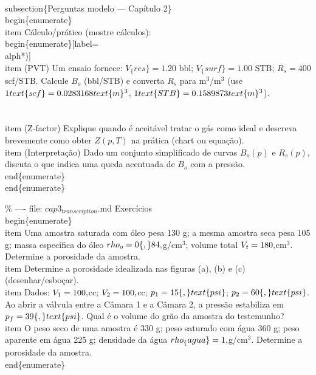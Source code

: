 \documentclass[11pt,a4paper]{article}
\begin{document}
\begin{enumerate}
{\\subsection\{Perguntas modelo — Capítulo 2\}
\\begin\{enumerate\}
\\item Cálculo/prático (mostre cálculos):
\\begin\{enumerate\}[label=\\alph*)]
\\item (PVT) Um ensaio fornece: $V_\{res\}=1.20$ bbl; $V_\{surf\}=1.00$ STB; $R_s=400$ scf/STB. Calcule $B_o$ (bbl/STB) e converta $R_s$ para m$^3$/m$^3$ (use $1\\ \\text\{scf\}=0.0283168\\ \\text\{m\}^3$, $1\\ \\text\{STB\}=0.1589873\\ \\text\{m\}^3$).\\\\[2\\baselineskip]
\\item (Z‑factor) Explique quando é aceitável tratar o gás como ideal e descreva brevemente como obter $Z(p,T)$ na prática (chart ou equação).
\\item (Interpretação) Dado um conjunto simplificado de curvas $B_o(p)$ e $R_s(p)$, discuta o que indica uma queda acentuada de $B_o$ com a pressão.
\\end\{enumerate\}
\\end\{enumerate\}


\% ---- file: $cap3_{transcription}$.md
Exercícios
\\begin\{enumerate\}
\\item Uma amostra saturada com óleo pesa 130 g; a mesma amostra seca pesa 105 g; massa específica do óleo $\\rho_o=0\{,\}84\\,$g/cm$^3$; volume total $V_t=180\\,$cm$^3$. Determine a porosidade da amostra.
\\item Determine a porosidade idealizada nas figuras (a), (b) e (c) (desenhar/esboçar).
\\item Dados: $V_1=100\\,$cc; $V_2=100\\,$cc; $p_1=15\{\\,\}\\text\{psi\}$; $p_2=60\{\\,\}\\text\{psi\}$. Ao abrir a válvula entre a Câmara 1 e a Câmara 2, a pressão estabiliza em $p_f=39\{\\,\}\\text\{psi\}$. Qual é o volume do grão da amostra do testemunho?
\\item O peso seco de uma amostra é 330 g; peso saturado com água 360 g; peso aparente em água 225 g; densidade da água $\\rho_\{agua\}=1\\,$g/cm$^3$. Determine a porosidade da amostra.
\\end\{enumerate\}


}
\end{enumerate}
\end{document}

